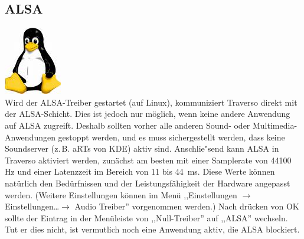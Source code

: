\subsection{ALSA}
\includegraphics[height=\baselineskip]{../images/tux.png}
\\
Wird der ALSA-Treiber gestartet (auf Linux), kommuniziert Traverso direkt mit der ALSA-Schicht. Dies ist jedoch nur möglich, wenn keine andere Anwendung auf ALSA zugreift. Deshalb sollten vorher alle anderen Sound- oder Multimedia-Anwendungen gestoppt werden, und es muss sichergestellt werden, dass keine Soundserver (z.\,B. aRTs von KDE) aktiv sind. Anschlie"send kann ALSA in Traverso aktiviert werden, zunächst am besten mit einer Samplerate von 44100 Hz und einer Latenzzeit im Bereich von 11 bis 44~ms. Diese Werte können natürlich den Bedürfnissen und der Leistungsfähigkeit der Hardware angepasst werden. (Weitere Einstellungen können im Menü ,,Einstellungen $\rightarrow$ Einstellungen\dots $\rightarrow$ Audio Treiber'' vorgenommen werden.) Nach drücken von OK sollte der Eintrag in der Menüleiste von ,,Null-Treiber'' auf ,,ALSA'' wechseln. Tut er dies nicht, ist vermutlich noch eine Anwendung aktiv, die ALSA blockiert.

